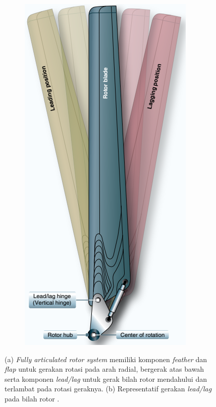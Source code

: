 \begin{figure}[H]
\begin{subfigure}{0.17\textwidth}
		\includegraphics[width=\linewidth]{gambar/lead-lag.png}
		\caption{}
		\label{fig:lead/lag}
	\end{subfigure}
	\caption{(a) \textit{Fully articulated rotor system} memiliki komponen \textit{feather} dan \textit{flap} untuk gerakan rotasi pada arah radial, bergerak atas bawah serta komponen \textit{lead/lag} untuk gerak bilah rotor mendahului dan terlambat pada rotasi geraknya. (b) Representatif gerakan \textit{lead/lag} pada bilah rotor \cite{handbook}.} 
	\label{fig:fullyarticulated}
\end{figure}

